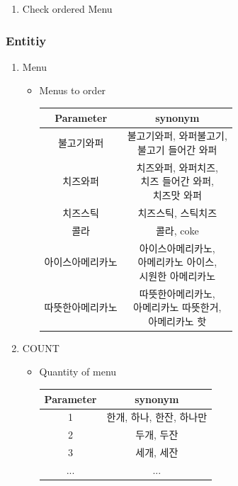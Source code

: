 \documentclass[conference,compsoc]{IEEEtran}
\begin{document}
\begin{enumerate}
\begin{enumerate}
  \end{enumerate}

  \item Check ordered Menu
\end{enumerate}

\subsubsection{Entitiy}
\begin{enumerate}
  \item Menu
  \begin{itemize}
    \item Menus to order
    \begin{table}[ht!] \renewcommand\arraystretch{1.25}
      \centering
        \begin{tabular}{@{}c | c @{}}
        \hline
        Parameter & synonym \\ 
        \hline
        불고기와퍼 & \makecell{불고기와퍼, 와퍼불고기, \\ 불고기 들어간 와퍼} \\ 
        \hline
        치즈와퍼 & \makecell{치즈와퍼, 와퍼치즈, \\ 치즈 들어간 와퍼, \\ 치즈맛 와퍼} \\
        \hline
        치즈스틱 & 치즈스틱, 스틱치즈 \\
        \hline
        콜라 & 콜라, coke \\
        \hline
        아이스아메리카노 &	\makecell{아이스아메리카노, \\ 아메리카노 아이스, \\ 시원한 아메리카노} \\
        \hline
        따뜻한아메리카노	& \makecell{따뜻한아메리카노, \\ 아메리카노 따뜻한거, \\ 아메리카노 핫} \\
        \hline
        \end{tabular}
    \end{table} 

  \end{itemize}

  \item COUNT
  \begin{itemize}
    \item Quantity of menu
    \begin{table}[ht!] \renewcommand\arraystretch{1.25}
      \centering
        \begin{tabular}{@{}c | c @{}}
        \hline
        Parameter & synonym \\ 
        \hline
        1 & 한개, 하나, 한잔, 하나만 \\ 
        \hline
        2 & 두개, 두잔 \\
        \hline
        3 & 세개, 세잔 \\
        \hline
        ... & ... \\
        \hline
        \end{tabular}
    \end{table} 


\end{itemize}
\end{enumerate}
\end{document}
